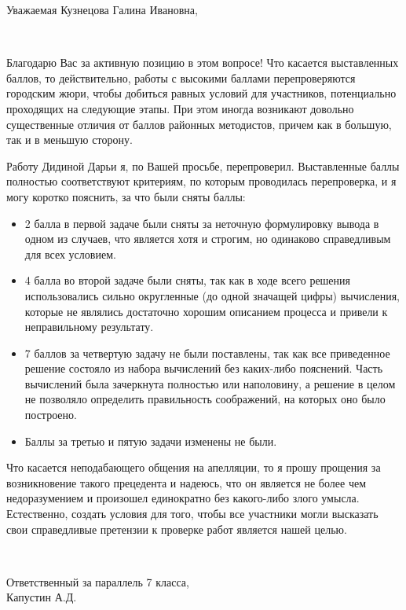 \documentclass[a4paper, 11pt]{article}
\begin{document}
	Уважаемая Кузнецова Галина Ивановна,
	
	\
	
	Благодарю Вас за активную позицию в этом вопросе! Что касается выставленных баллов, то действительно, работы с высокими баллами перепроверяются городским жюри, чтобы добиться равных условий для участников, потенциально проходящих на следующие этапы. При этом иногда возникают довольно существенные отличия от баллов районных методистов, причем как в большую, так и в меньшую сторону.
	
	Работу Дидиной Дарьи я, по Вашей просьбе, перепроверил. Выставленные баллы полностью соответствуют критериям, по которым проводилась перепроверка, и я могу коротко пояснить, за что были сняты баллы:
	\begin{itemize}
		\item{2 балла в первой задаче были сняты за неточную формулировку вывода в одном из случаев, что является хотя и строгим, но одинаково справедливым для всех условием.}
		\item{4 балла во второй задаче были сняты, так как в ходе всего решения использовались сильно округленные (до одной значащей цифры) вычисления, которые не являлись достаточно хорошим описанием процесса и привели к неправильному результату.}
		\item{7 баллов за четвертую задачу не были поставлены, так как все приведенное решение состояло из набора вычислений без каких-либо пояснений. Часть вычислений была зачеркнута полностью или наполовину, а решение в целом не позволяло определить правильность соображений, на которых оно было построено.}
		\item{Баллы за третью и пятую задачи изменены не были.}
	\end{itemize}
	
	Что касается неподабающего общения на апелляции, то я прошу прощения за возникновение такого прецедента и надеюсь, что он является не более чем недоразумением и произошел единократно без какого-либо злого умысла. Естественно, создать условия для того, чтобы все участники могли высказать свои справедливые претензии к проверке работ является нашей целью.
	
	\
	
	\begin{flushright}
		Ответственный за параллель 7 класса, \\
		Капустин А.Д.
	\end{flushright} 
\end{document}
